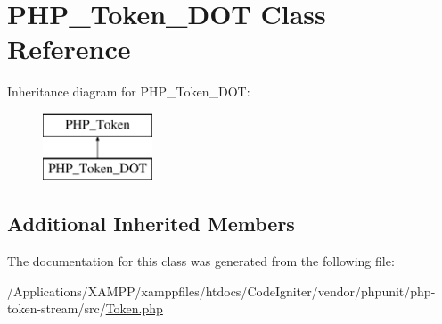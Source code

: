 \hypertarget{class_p_h_p___token___d_o_t}{}\section{P\+H\+P\+\_\+\+Token\+\_\+\+D\+OT Class Reference}
\label{class_p_h_p___token___d_o_t}
Inheritance diagram for P\+H\+P\+\_\+\+Token\+\_\+\+D\+OT\+:\begin{figure}[H]
\begin{center}
\leavevmode
\includegraphics[height=2.000000cm]{class_p_h_p___token___d_o_t}
\end{center}
\end{figure}
\subsection*{Additional Inherited Members}


The documentation for this class was generated from the following file\+:\begin{DoxyCompactItemize}
\item 
/\+Applications/\+X\+A\+M\+P\+P/xamppfiles/htdocs/\+Code\+Igniter/vendor/phpunit/php-\/token-\/stream/src/\mbox{\hyperlink{_token_8php}{Token.\+php}}\end{DoxyCompactItemize}
